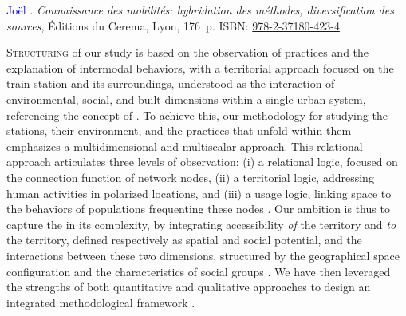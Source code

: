 \begin{refsegment}
\begin{displayquote}
\textcolor{blue}{Joël} \textcolor{blue}{\textcite[12-14, 160]{meissonnier_connaissance_2020}}. \textsl{Connaissance des mobilités: hybridation des méthodes, diversification des sources}, Éditions du Cerema, Lyon, 176~p. ISBN: \href{https://search.worldcat.org/fr/title/1236011015}{978-2-37180-423-4}
    \end{displayquote}

\lettrine[lines=3, findent=8pt, nindent=0pt]{ S}{tructuring} of our study is based on the observation of practices and the explanation of intermodal behaviors, with a territorial approach focused on the train station and its surroundings, understood as the interaction of environmental, social, and built dimensions within a single urban system, referencing the concept of  \textcolor{blue}{\autocite[7]{moretti_interconnexion_1999}}. To achieve this, our methodology for studying the stations, their environment, and the practices that unfold within them emphasizes a multidimensional and multiscalar approach. This relational approach articulates three levels of observation: (i) a relational logic, focused on the connection function of network nodes, (ii) a territorial logic, addressing human activities in polarized locations, and (iii) a usage logic, linking space to the behaviors of populations frequenting these nodes \textcolor{blue}{\autocites[9]{moretti_interconnexion_1999}[210-212]{menerault_gares_2001}}. Our ambition is thus to capture the  in its complexity, by integrating \gls{accessibility} \textsl{of} the territory and \textsl{to} the territory, defined respectively as spatial and social potential, and the interactions between these two dimensions, structured by the geographical space configuration and the characteristics of social groups \textcolor{blue}{\autocite[6]{richer_mesurer_2012}}. We have then leveraged the strengths of both quantitative and qualitative approaches to design an integrated methodological framework \textcolor{blue}{\autocite[]{bergman_advances_2008}}.%


\end{refsegment}
